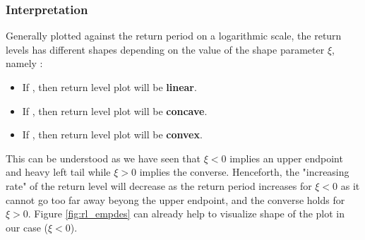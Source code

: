 \subsubsection*{Interpretation}

Generally plotted against the return period on a logarithmic scale, the return levels has different shapes depending on the value of the shape parameter $\xi$, namely :

\begin{itemize}
	\item If , then return level plot will be \textbf{linear}.
     \item If , then return level plot will be \textbf{concave}.
     \item If , then return level plot will be \textbf{convex}.
\end{itemize}
This can be understood as we have seen that $\xi<0$ implies an upper endpoint and heavy left tail while $\xi>0$ implies the converse. Henceforth, the "increasing rate" of the return level will decrease as the return period increases for $\xi<0$ as it cannot go too far away beyong the upper endpoint, and the converse holds for $\xi>0$. Figure \ref{fig:rl_empdes} can already help to visualize shape of the plot in our case ($\xi<0$).

\iffalse
